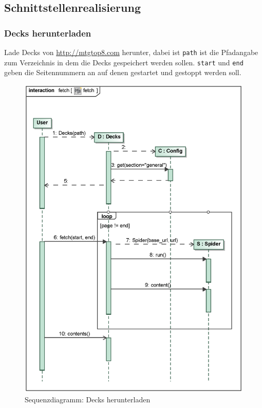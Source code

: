 \subsection{Schnittstellenrealisierung}
%
%
\subsubsection{Decks herunterladen}
Lade Decks von \url{http://mtgtop8.com} herunter, dabei ist \verb|path| ist die Pfadangabe zum Verzeichnis in dem die Decks gespeichert werden sollen. \verb|start| und \verb|end| geben die Seitennummern an auf denen gestartet und gestoppt werden soll.
\begin{figure}[H]
    \myfloatalign
    \includegraphics[width=\textwidth]{gfx/MtGDeepAnalysis/cli_fetch.eps}
    \caption{Sequenzdiagramm: Decks herunterladen}
    \label{fig:seq:fetch}
\end{figure}

